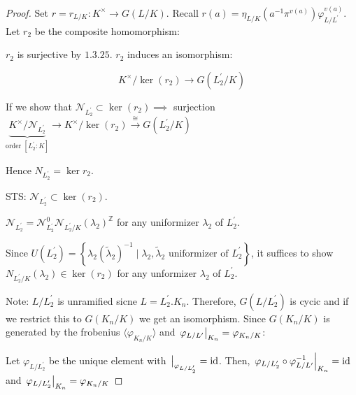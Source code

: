 \documentclass{article}
\theoremstyle{definition}
\numberwithin{theorem}{subsection}
\begin{document}
    \begin{proof}
        Set \(r = r_{L / K}: K^\times \to G(L / K)\). Recall \(r(a) = \eta_{L / K}(a ^{-1} \pi^{v(a)}) \varphi_{L / L^{\prime}}^{v(a)}\). Let \(r_2\) be the composite homomorphism:
        
        \begin{center}
        \end{center}

        \(r_2\)  is surjective by \(1.3.25\). \(r_2\) induces an isomorphism:

        \[
            K^\times / \ker(r_2) \to G(L_2^{\prime} / K)
        \]

        If we show that \(\mathcal{N}_{L_2^{\prime}} \subset \ker (r_2) \implies\) surjection \(\underbrace{K^\times / \mathcal{N}_{L_2^{\prime}}}_{\text{order } [L_2^{\prime} : K]} \to K^\times / \ker(r_2) \xrightarrow{\cong} G(L_2^{\prime} / K) \)
        
        Hence \(N_{L_2^{\prime}} = \ker r_2\).

        STS: \(\mathcal{N}_{L_2^{\prime}} \subset \ker(r_2)\).

        \(\mathcal{N}_{L_2^{\prime}}= \mathcal{N}_{L_2^{\prime}}^0 \mathcal{N}_{L_2^{\prime} / K}(\lambda_2)^\mathbb{Z}\) for any uniformizer \(\lambda_2\) of \(L_2^{\prime}\).
        
        Since \(U(L_2^{\prime}) = \left\{ \lambda_2(\widetilde{\lambda}_2) ^{-1} \mid \lambda_2, \widetilde{\lambda}_2 \text{ uniformizer of } L_2^{\prime} \right\} \), it suffices to show \(N_{L_2^{\prime} / K}(\lambda_2) \in \ker (r_2)\) for any unformizer \(\lambda_2\) of \(L_2^{\prime}\).

        Note: \(L / L_2^{\prime}\) is unramified sicne \(L = L_2^{\prime} . K_n\). Therefore, \(G(L / L_2^{\prime})\) is cycic and if we restrict this to \(G(K_n / K)\) we get an isomorphism. Since \(G(K_n / K)\) is generated by the frobenius \(\langle \varphi_{K_n / K} \rangle \) and \(\eval{\varphi_{L / L^{\prime}}}_{K_n} =\varphi_{K_n / K}\):

        Let \(\varphi_{L / L_2^{\prime}}\) be the unique element with \(\eval_{\varphi_{L / L_2^{\prime}}}= \operatorname{id}\). Then, \(\eval{\varphi_{L / L_2^{\prime}} \circ \varphi_{L / L^{\prime}} ^{-1}}_{K_n} = \operatorname{id}\) and \(\eval{\varphi_{L / L_2^{\prime}}}_{K_n}  = \varphi_{K_n / K}\)  


\end{proof}
\end{document}
